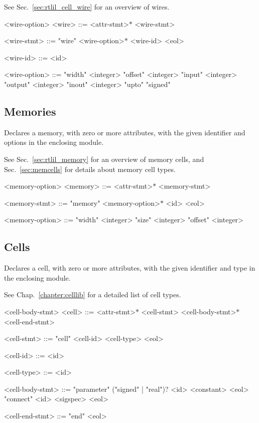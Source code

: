 See Sec.~\ref{sec:rtlil_cell_wire} for an overview of wires.

\begin{indentgrammar}{<wire-option>}
<wire> ::= <attr-stmt>$*$ <wire-stmt>

<wire-stmt> ::= "wire" <wire-option>$*$ <wire-id> <eol>

<wire-id> ::= <id>

<wire-option> ::= 
"width" <integer>
  \alt "offset" <integer>
  \alt "input" <integer>
  \alt "output" <integer>
  \alt "inout" <integer>
  \alt "upto"
  \alt "signed"
\end{indentgrammar}

\subsection{Memories}

Declares a memory, with zero or more attributes, with the given identifier and options in the enclosing module.

See Sec.~\ref{sec:rtlil_memory} for an overview of memory cells, and Sec.~\ref{sec:memcells} for details about memory cell types.

\begin{indentgrammar}{<memory-option>}
<memory> ::= <attr-stmt>$*$ <memory-stmt>

<memory-stmt> ::= "memory" <memory-option>$*$ <id> <eol>

<memory-option> ::= 
"width" <integer>
  \alt "size" <integer>
  \alt "offset" <integer>
\end{indentgrammar}

\subsection{Cells}

Declares a cell, with zero or more attributes, with the given identifier and type in the enclosing module.

See Chap.~\ref{chapter:celllib} for a detailed list of cell types.

\begin{indentgrammar}{<cell-body-stmt>}
<cell> ::= <attr-stmt>$*$ <cell-stmt> <cell-body-stmt>$*$ <cell-end-stmt>

<cell-stmt> ::= "cell" <cell-id> <cell-type> <eol>

<cell-id> ::= <id>

<cell-type> ::= <id>

<cell-body-stmt> ::= 
"parameter" ("signed" | "real")$?$ <id> <constant> <eol>
  \alt "connect" <id> <sigspec> <eol>

<cell-end-stmt> ::= "end" <eol>
\end{indentgrammar}

